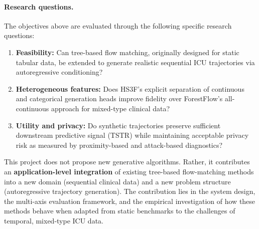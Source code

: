 \documentclass[11pt]{informatics-report}
\begin{document}
\paragraph{Research questions.}
The objectives above are evaluated through the following specific research questions:

\begin{enumerate}
    \item \textbf{Feasibility:} Can tree-based flow matching, originally designed for static tabular data, be extended to generate realistic sequential ICU trajectories via autoregressive conditioning?
    \item \textbf{Heterogeneous features:} Does HS3F's explicit separation of continuous and categorical generation heads improve fidelity over ForestFlow's all-continuous approach for mixed-type clinical data?
    \item \textbf{Utility and privacy:} Do synthetic trajectories preserve sufficient downstream predictive signal (TSTR) while maintaining acceptable privacy risk as measured by proximity-based and attack-based diagnostics?
\end{enumerate}

This project does not propose new generative algorithms.
Rather, it contributes an \textbf{application-level integration} of existing tree-based flow-matching methods into a new domain (sequential clinical data) and a new problem structure (autoregressive trajectory generation).
The contribution lies in the system design, the multi-axis evaluation framework, and the empirical investigation of how these methods behave when adapted from static benchmarks to the challenges of temporal, mixed-type ICU data.









\end{document}

